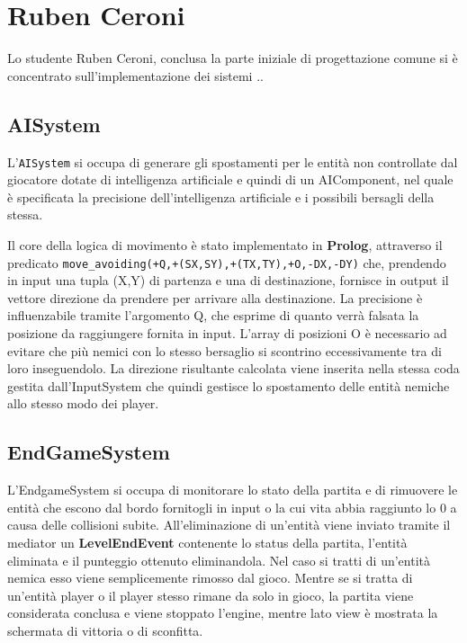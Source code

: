 \section{Ruben Ceroni}


Lo studente Ruben Ceroni, conclusa la parte iniziale di progettazione comune si è concentrato sull'implementazione dei sistemi ..

\subsection{AISystem}
L'\texttt{AISystem} si occupa di generare gli spostamenti per le entità non controllate dal giocatore dotate di intelligenza artificiale e quindi di un AIComponent, nel quale è specificata la precisione dell'intelligenza artificiale e i possibili bersagli della stessa.

Il core della logica di movimento è stato implementato in \textbf{Prolog}, attraverso il predicato \texttt{move\_avoiding(+Q,+(SX,SY),+(TX,TY),+O,-DX,-DY)} che, prendendo in input una tupla (X,Y) di partenza e una di destinazione, fornisce in output il vettore direzione da prendere per arrivare alla destinazione.
La precisione è influenzabile tramite l'argomento Q, che esprime di quanto verrà falsata la posizione da raggiungere fornita in input.
L'array di posizioni O è necessario ad evitare che più nemici con lo stesso bersaglio si scontrino eccessivamente tra di loro inseguendolo.
La direzione risultante calcolata viene inserita nella stessa coda gestita dall'InputSystem che quindi gestisce lo spostamento delle entità nemiche allo stesso modo dei player.

\subsection{EndGameSystem}
L'EndgameSystem si occupa di monitorare lo stato della partita e di rimuovere le entità che escono dal bordo fornitogli in input o la cui vita abbia raggiunto lo 0 a causa delle collisioni subite.
All'eliminazione di un'entità  viene inviato tramite il mediator un \textbf{LevelEndEvent} contenente lo status della partita, l'entità eliminata e il punteggio ottenuto eliminandola.
Nel caso si tratti di un'entità nemica esso viene semplicemente rimosso dal gioco.
Mentre se si tratta di un'entità player o il player stesso rimane da solo in gioco, la partita viene considerata conclusa e viene stoppato l'engine, mentre lato view è mostrata la schermata di vittoria o di sconfitta. 
 
